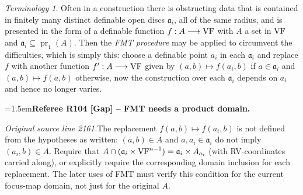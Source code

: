 \documentclass[12pt]{amsart}
\newcommand{\RefereeRemark}[4]{%
  \par\medskip\begingroup\normalfont\small\color{RefereePurple}%
  \emergencystretch=1.5em\noindent\textbf{Referee R#1 [#2] -- #3.}\par\nobreak\noindent #4\par
  \endgroup\medskip
}
\newcommand{\memph}[1]{{\color{magenta}\emph{#1}}}
\theoremstyle{plain}
\theoremstyle{definition}
\theoremstyle{remark}
\newtheorem{ter}[thm]{Terminology}
\numberwithin{equation}{section}
\theoremstyle{plain}
\newcommand{\VF}{\textup{VF}}
\DeclareMathOperator{\pr}{pr}
\newcommand{\ga}{\mathfrak{a}}
\newcommand{\0}{\emptyset}
\newcommand{\fun}{\longrightarrow}
\newcommand{\efun}{\longmapsto}
\newcommand{\sub}{\subseteq}
\begin{document}
\begin{ter}\label{FMT}
Often in a construction there is obstructing data that is contained in finitely many distinct definable open discs $\ga_i$, all of the same radius, and is presented in the form of a definable function $f : A \fun \VF$ with $A$ a set in $\VF$ and $\ga_i \sub \pr_1(A)$. Then the \memph{FMT procedure} may be applied to circumvent the difficulties, which is simply this: choose a definable point $a_i$ in each $\ga_i$ and replace $f$ with another function $f' : A \fun \VF$ given by $(a,b) \efun f(a_i, b)$ if $a \in \ga_i$ and $(a,b) \efun f(a,b)$ otherwise, now the construction over each $\ga_i$ depends on $a_i$ and hence no longer varies.
\end{ter}

\RefereeRemark{104}{Gap}{FMT needs a product domain}{%
\textit{Original source line 2161.}\quad The replacement $f(a,b)\mapsto f(a_i,b)$ is not defined from the hypotheses as written: $(a,b)\in A$ and $a,a_i\in\ga_i$ do not imply $(a_i,b)\in A$. Require that $A\cap(\ga_i\times\VF^{n-1})=\ga_i\times A_{a_i}$ (with RV-coordinates carried along), or explicitly require the corresponding domain inclusion for each replacement. The later uses of FMT must verify this condition for the current focus-map domain, not just for the original $A$.
}
\end{document}
